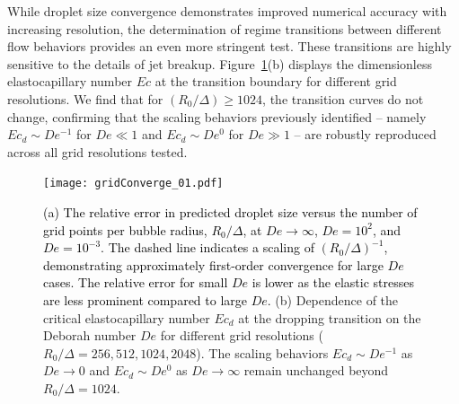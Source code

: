 \documentclass{jfm}
\newcommand{\rev}[1]{{\textcolor{black}{#1}}}
\begin{document}
While droplet size convergence demonstrates improved numerical accuracy with increasing resolution, the determination of regime transitions between different flow behaviors provides an even more stringent test. These transitions are highly sensitive to the details of jet breakup. Figure~\ref{fig:gis}(b) displays the dimensionless elastocapillary number $Ec$ at the transition boundary for different grid resolutions. We find that for $(R_0/\Delta) \geq 1024$, the transition curves do not change, confirming that the scaling behaviors previously identified -- namely $Ec_d \sim De^{-1}$ for $De \ll 1$ and $Ec_d \sim De^0$ for $De \gg 1$ -- are robustly reproduced across all grid resolutions tested.

\begin{figure}
	\centering
	\texttt{[image: gridConverge\_01.pdf]}
	\caption{ \rev{(a) The relative error in predicted droplet size versus the number of grid points per bubble radius, $R_0/\Delta$, at $De \to \infty$, $De = 10^2$, and $De = 10^{-3}$. The dashed line indicates a scaling of $(R_0/\Delta)^{-1}$, demonstrating approximately first-order convergence for large $De$ cases. The relative error for small $De$ is lower as the elastic stresses are less prominent compared to large $De$.} (b) Dependence of the critical elastocapillary number $Ec_d$ at the dropping transition on the Deborah number $De$ for different grid resolutions ($R_0/\Delta = 256, 512, 1024, 2048$). The scaling behaviors $Ec_d \sim De^{-1}$ as $De \to 0$ and $Ec_d \sim De^0$ as $De \to \infty$ remain unchanged beyond $R_0/\Delta = 1024$.}
	\label{fig:gis}
\end{figure}
\end{document}
